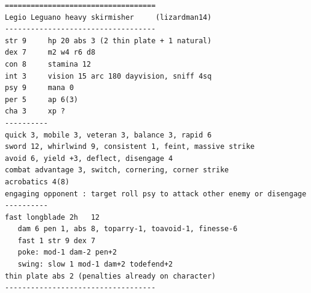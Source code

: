 \goodbreak
\begin{samepage}
\small \begin{verbatim}
===================================
Legio Leguano heavy skirmisher     (lizardman14)
-----------------------------------
str 9     hp 20 abs 3 (2 thin plate + 1 natural)
dex 7     m2 w4 r6 d8
con 8     stamina 12
int 3     vision 15 arc 180 dayvision, sniff 4sq
psy 9     mana 0
per 5     ap 6(3)
cha 3     xp ?
----------
quick 3, mobile 3, veteran 3, balance 3, rapid 6
sword 12, whirlwind 9, consistent 1, feint, massive strike
avoid 6, yield +3, deflect, disengage 4
combat advantage 3, switch, cornering, corner strike
acrobatics 4(8)
engaging opponent : target roll psy to attack other enemy or disengage
----------
fast longblade 2h   12
   dam 6 pen 1, abs 8, toparry-1, toavoid-1, finesse-6
   fast 1 str 9 dex 7
   poke: mod-1 dam-2 pen+2
   swing: slow 1 mod-1 dam+2 todefend+2
thin plate abs 2 (penalties already on character)
-----------------------------------
\end{verbatim} \normalsize
\end{samepage}

\


